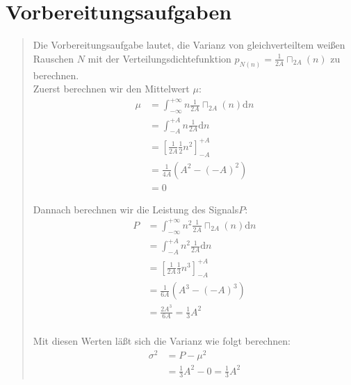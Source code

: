 \section{Vorbereitungsaufgaben}

    \begin{quote}
    Die Vorbereitungsaufgabe lautet, die Varianz von gleichverteiltem weißen Rauschen $N$ mit der
    Verteilungsdichtefunktion $p_{N(n)} = \frac{1}{2A} \sqcap_{2A} (n)$ zu berechnen.\\
    Zuerst berechnen wir den Mittelwert $\mu$:
   	\begin{equation*}
    	\begin{split}
    		\mu &= \int_{-\infty}^{+\infty} n \frac{1}{2A} \sqcap_{2A} (n) \mathrm dn\\
    		&= \int_{-A}^{+A} n \frac{1}{2A} \mathrm dn\\
    		&= \left[ \frac{1}{2A} \frac{1}{2} n^2 \right]_{-A}^{+A}\\
    		&= \frac{1}{4A} (A^2-(-A)^2)\\
    		&= 0
    	\end{split}
    \end{equation*}
    
    Dannach berechnen wir die Leistung des Signals$P$:\\
    \begin{equation*}
    	\begin{split}
    		P &= \int_{-\infty}^{+\infty} n^2 \frac{1}{2A} \sqcap_{2A} (n) \mathrm dn\\
    		&= \int_{-A}^{+A} n^2 \frac{1}{2A} \mathrm dn\\
    		&= \left[ \frac{1}{2A} \frac{1}{3} n^3 \right]_{-A}^{+A}\\
    		&= \frac{1}{6A} (A^3-(-A)^3)\\
            &= \frac{2A^3}{6A} = \frac{1}{3} A^2\\
    	\end{split}
    \end{equation*}
    
    Mit diesen Werten läßt sich die Varianz wie folgt berechnen:
    \begin{equation*}
    	\begin{split}
    		\sigma^2 &= P - \mu^2\\
    		&= \frac{1}{3} A^2 - 0 = \frac{1}{3} A^2
    	\end{split}
    \end{equation*}
	\end{quote}
         	


